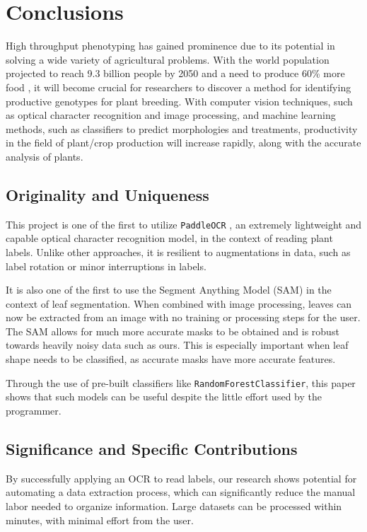 \documentclass[final,5p,times,twocolumn,authoryear]{elsarticle}
\begin{document}
\section{Conclusions}

High throughput phenotyping has gained prominence due to its potential in solving a wide variety of agricultural problems. With the world population projected to reach 9.3 billion people by 2050 and a need to produce 60\% more food \citep{silva2012feeding}, it will become crucial for researchers to discover a method for identifying productive genotypes for plant breeding. With computer vision techniques, such as optical character recognition and image processing, and machine learning methods, such as classifiers to predict morphologies and treatments, productivity in the field of plant/crop production will increase rapidly, along with the accurate analysis of plants.

\subsection{Originality and Uniqueness}

This project is one of the first to utilize \verb|PaddleOCR| \citep{du2020ppocr}, an extremely lightweight and capable optical character recognition model, in the context of reading plant labels. Unlike other approaches, it is resilient to augmentations in data, such as label rotation or minor interruptions in labels.

It is also one of the first to use the Segment Anything Model (SAM) \citep{kirillov2023segment} in the context of leaf segmentation. When combined with image processing, leaves can now be extracted from an image with no training or processing steps for the user. The SAM allows for much more accurate masks to be obtained and is robust towards heavily noisy data such as ours. This is especially important when leaf shape needs to be classified, as accurate masks have more accurate features.

Through the use of pre-built classifiers like \verb|RandomForestClassifier|, this paper shows that such models can be useful despite the little effort used by the programmer.

\subsection{Significance and Specific Contributions}

By successfully applying an OCR to read labels, our research shows potential for automating a data extraction process, which can significantly reduce the manual labor needed to organize information. Large datasets can be processed within minutes, with minimal effort from the user.
\end{document}
